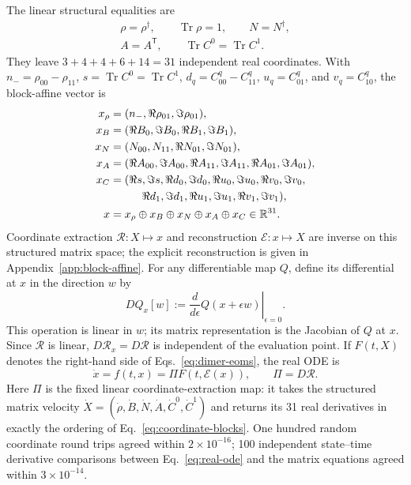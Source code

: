 \documentclass[10pt,twocolumn]{article}
\newcommand{\R}{\mathbb R}
\newcommand{\Tr}{\operatorname{Tr}}
\begin{document}
The linear structural equalities are
\begin{equation}
\begin{gathered}
\rho=\rho^\dagger,\qquad \Tr\rho=1,\qquad N=N^\dagger,\\
A=A^{\mathsf T},\qquad \Tr C^0=\Tr C^1.
\end{gathered}
\label{eq:linear-structure}
\end{equation}
They leave $3+4+4+6+14=31$ independent real coordinates.  With
$n_-=\rho_{00}-\rho_{11}$, $s=\Tr C^0=\Tr C^1$,
$d_q=C^q_{00}-C^q_{11}$, $u_q=C^q_{01}$, and $v_q=C^q_{10}$, the
block-affine vector is
{\small
\begin{equation}
\begin{aligned}
x_\rho&=(n_-,\Re\rho_{01},\Im\rho_{01}),\\
x_B&=(\Re B_0,\Im B_0,\Re B_1,\Im B_1),\\
x_N&=(N_{00},N_{11},\Re N_{01},\Im N_{01}),\\
x_A&=(\Re A_{00},\Im A_{00},\Re A_{11},\Im A_{11},
\Re A_{01},\Im A_{01}),\\
x_C&=(\Re s,\Im s,\Re d_0,\Im d_0,\Re u_0,\Im u_0,
\Re v_0,\Im v_0,\\
&\hspace{2.9em}\Re d_1,\Im d_1,\Re u_1,\Im u_1,\Re v_1,\Im v_1),\\
x&=x_\rho\oplus x_B\oplus x_N\oplus x_A\oplus x_C\in\R^{31}.
\end{aligned}
\label{eq:coordinate-blocks}
\end{equation}}
Coordinate extraction $\mathcal R:X\mapsto x$ and reconstruction
$\mathcal E:x\mapsto X$ are inverse on this structured matrix space; the
explicit reconstruction is given in Appendix~\ref{app:block-affine}.  For any
differentiable map $Q$, define its differential at $x$ in the direction $w$ by
\[
DQ_x[w]:=
\left.\frac{d}{d\epsilon}Q(x+\epsilon w)\right|_{\epsilon=0}.
\]
This operation is linear in $w$; its matrix representation is the Jacobian of
$Q$ at $x$.  Since $\mathcal R$ is linear, $D\mathcal R_x=D\mathcal R$ is
independent of the evaluation point.  If
$F(t,X)$ denotes the right-hand side of Eqs.~\eqref{eq:dimer-eoms}, the real
ODE is
\begin{equation}
\dot x=f(t,x)=\Pi F(t,\mathcal E(x)),
\qquad \Pi=D\mathcal R.
\label{eq:real-ode}
\end{equation}
Here $\Pi$ is the fixed linear coordinate-extraction map: it takes the
structured matrix velocity
$\dot X=(\dot\rho,\dot B,\dot N,\dot A,\dot C^0,\dot C^1)$ and returns its
31 real derivatives in exactly the ordering of
Eq.~\eqref{eq:coordinate-blocks}.
One hundred random coordinate round trips agreed within $2\times10^{-16}$;
100 independent state--time derivative comparisons between
Eq.~\eqref{eq:real-ode} and the matrix equations agreed within
$3\times10^{-14}$.
\end{document}
